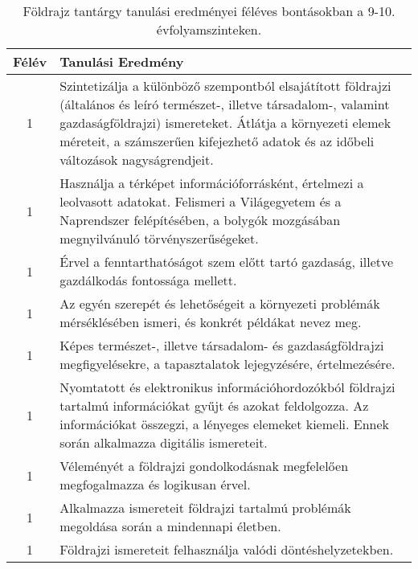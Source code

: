        
           \begin{longtable}{c | p{} }
            \caption[Földrajz 9-10.]{Földrajz tantárgy tanulási eredményei féléves bontásokban a 9-10. évfolyamszinteken. }  \\

            \textbf{Félév} & \textbf{Tanulási Eredmény} \\
            \hline
            \endhead
                                
                                          1 &  Szintetizálja a különböző szempontból elsajátított földrajzi (általános és leíró természet-, illetve társadalom-, valamint gazdaságföldrajzi) ismereteket. Átlátja a környezeti elemek méreteit, a számszerűen kifejezhető adatok és az időbeli változások nagyságrendjeit. \\ \hline
                                          1 &  Használja a térképet információforrásként, értelmezi a leolvasott adatokat. Felismeri a Világegyetem és a Naprendszer felépítésében, a bolygók mozgásában megnyilvánuló törvényszerűségeket. \\ \hline
                                          1 &  Érvel a fenntarthatóságot szem előtt tartó gazdaság, illetve gazdálkodás fontossága mellett. \\ \hline
                                          1 &  Az egyén szerepét és lehetőségeit a környezeti problémák mérséklésében ismeri, és konkrét példákat nevez meg. \\ \hline
                                          1 &  Képes természet-, illetve társadalom- és gazdaságföldrajzi megfigyelésekre, a tapasztalatok lejegyzésére, értelmezésére. \\ \hline
                                          1 &  Nyomtatott és elektronikus információhordozókból földrajzi tartalmú információkat gyűjt és azokat feldolgozza. Az információkat összegzi, a lényeges elemeket kiemeli. Ennek során alkalmazza digitális ismereteit. \\ \hline
                                          1 &  Véleményét a földrajzi gondolkodásnak megfelelően megfogalmazza és logikusan érvel. \\ \hline
                                          1 &  Alkalmazza ismereteit földrajzi tartalmú problémák megoldása során a mindennapi életben. \\ \hline
                                          1 &  Földrajzi ismereteit felhasználja valódi döntéshelyzetekben. \\ \hline
                                      

\end{longtable}
